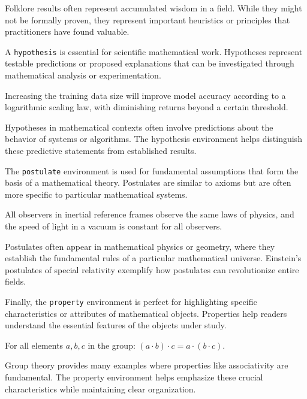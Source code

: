 \documentclass[9pt]{amsart}
\begin{document}
Folklore results often represent accumulated wisdom in a field. While they
might not be formally proven, they represent important heuristics or principles
that practitioners have found valuable.

A \texttt{hypothesis} is essential for scientific mathematical work. Hypotheses
represent testable predictions or proposed explanations that can be
investigated through mathematical analysis or experimentation.

\begin{hypothesis}
    Increasing the training data size will improve model accuracy according to a logarithmic scaling law, with diminishing returns beyond a certain threshold.
\end{hypothesis}

Hypotheses in mathematical contexts often involve predictions about the
behavior of systems or algorithms. The hypothesis environment helps distinguish
these predictive statements from established results.

The \texttt{postulate} environment is used for fundamental assumptions that
form the basis of a mathematical theory. Postulates are similar to axioms but
are often more specific to particular mathematical systems.

\begin{postulate}
    All observers in inertial reference frames observe the same laws of physics, and the speed of light in a vacuum is constant for all observers.
\end{postulate}

Postulates often appear in mathematical physics or geometry, where they
establish the fundamental rules of a particular mathematical universe.
Einstein's postulates of special relativity exemplify how postulates can
revolutionize entire fields.

Finally, the \texttt{property} environment is perfect for highlighting specific
characteristics or attributes of mathematical objects. Properties help readers
understand the essential features of the objects under study.

\begin{property}[Associativity]
    For all elements $a, b, c$ in the group: $(a \cdot b) \cdot c = a \cdot (b \cdot c)$.
\end{property}

Group theory provides many examples where properties like associativity are
fundamental. The property environment helps emphasize these crucial
characteristics while maintaining clear organization.
\end{document}
